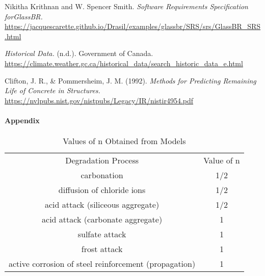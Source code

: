 \documentclass[12pt]{article}
\begin{document}
\begin{thebibliography}{9} 
    Nikitha Krithnan and W. Spencer Smith. \textit{Software Requirements Specification forGlassBR.}    \url{https://jacquescarette.github.io/Drasil/examples/glassbr/SRS/srs/GlassBR_SRS.html}
    
    \textit{Historical Data.} (n.d.). Government of Canada. \url{https://climate.weather.gc.ca/historical_data/search_historic_data_e.html}
    
    Clifton, J. R., \& Pommersheim, J. M. (1992). \textit{Methods for Predicting Remaining Life of Concrete in Structures.}
    \url{https://nvlpubs.nist.gov/nistpubs/Legacy/IR/nistir4954.pdf}
\end{thebibliography}

\newpage
\paragraph{Appendix}
\begin{table}[htbp]
    \begin{tabular}{cc}
        Degradation Process & Value of n\\
        carbonation & 1/2\\
        diffusion of chloride ions & 1/2\\
        acid attack (siliceous aggregate) & 1/2\\
        acid attack (carbonate aggregate) & 1\\
        sulfate attack & 1\\
        frost attack & 1\\
        active corrosion of steel reinforcement (propagation) & 1\\
    \end{tabular}
    \caption{Values of n Obtained from Models}
    \label{tab:factors}
\end{table}
\end{document}
